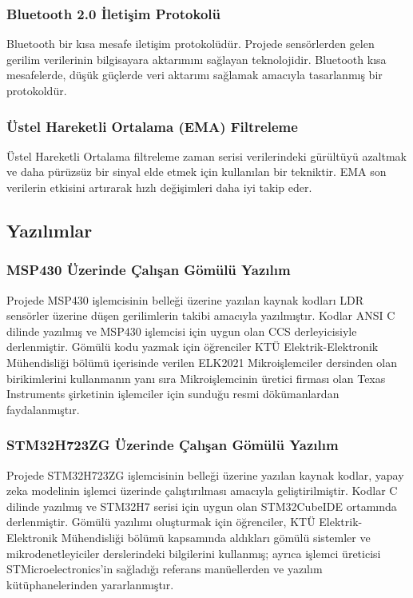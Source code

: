\subsubsection{Bluetooth 2.0 İletişim Protokolü}

Bluetooth bir kısa mesafe iletişim protokolüdür. Projede sensörlerden gelen gerilim verilerinin bilgisayara aktarımını sağlayan teknolojidir. Bluetooth kısa mesafelerde, düşük güçlerde veri aktarımı sağlamak amacıyla tasarlanmış bir protokoldür.

\subsubsection{Üstel Hareketli Ortalama (EMA) Filtreleme}

Üstel Hareketli Ortalama filtreleme zaman serisi verilerindeki gürültüyü azaltmak ve daha pürüzsüz bir sinyal elde etmek için kullanılan bir tekniktir. EMA son verilerin etkisini artırarak hızlı değişimleri daha iyi takip eder.

\subsection{Yazılımlar}

\subsubsection{MSP430 Üzerinde Çalışan Gömülü Yazılım}
Projede MSP430 işlemcisinin belleği üzerine yazılan kaynak kodları LDR sensörler üzerine düşen gerilimlerin takibi amacıyla yazılmıştır. Kodlar ANSI C dilinde yazılmış ve MSP430 işlemcisi için uygun olan CCS derleyicisiyle derlenmiştir. Gömülü kodu yazmak için öğrenciler KTÜ Elektrik-Elektronik Mühendisliği bölümü içerisinde verilen ELK2021 Mikroişlemciler dersinden olan birikimlerini kullanmanın yanı sıra Mikroişlemcinin üretici firması olan Texas Instruments şirketinin işlemciler için sunduğu resmi dökümanlardan faydalanmıştır.

\subsubsection{STM32H723ZG Üzerinde Çalışan Gömülü Yazılım}
Projede STM32H723ZG işlemcisinin belleği üzerine yazılan kaynak kodlar, yapay zeka modelinin işlemci üzerinde çalıştırılması amacıyla geliştirilmiştir. Kodlar C dilinde yazılmış ve STM32H7 serisi için uygun olan STM32CubeIDE ortamında derlenmiştir. Gömülü yazılımı oluşturmak için öğrenciler, KTÜ Elektrik-Elektronik Mühendisliği bölümü kapsamında aldıkları gömülü sistemler ve mikrodenetleyiciler derslerindeki bilgilerini kullanmış; ayrıca işlemci üreticisi STMicroelectronics'in sağladığı referans manüellerden ve yazılım kütüphanelerinden yararlanmıştır.

